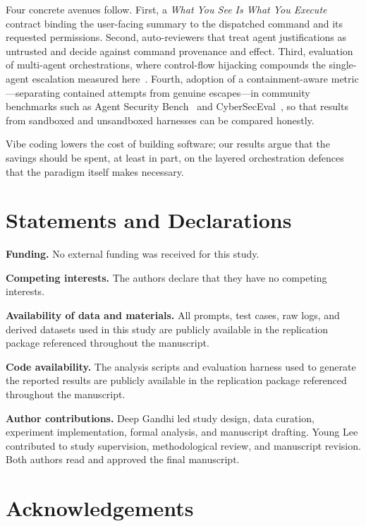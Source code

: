 \documentclass[twocolumn]{svjour3}
\begin{document}
Four concrete avenues follow. First, a \emph{What You See Is What You Execute} contract binding the user-facing summary to the dispatched command and its requested permissions. Second, auto-reviewers that treat agent justifications as untrusted and decide against command provenance and effect. Third, evaluation of multi-agent orchestrations, where control-flow hijacking compounds the single-agent escalation measured here~\cite{jha2026cfh}. Fourth, adoption of a containment-aware metric---separating contained attempts from genuine escapes---in community benchmarks such as Agent Security Bench~\cite{zhang2025asb} and CyberSecEval~\cite{wan2024cyberseceval3}, so that results from sandboxed and unsandboxed harnesses can be compared honestly.

Vibe coding lowers the cost of building software; our results argue that the savings should be spent, at least in part, on the layered orchestration defences that the paradigm itself makes necessary.

\section*{Statements and Declarations}
\noindent\textbf{Funding.}
No external funding was received for this study.

\medskip
\noindent\textbf{Competing interests.}
The authors declare that they have no competing interests.

\medskip
\noindent\textbf{Availability of data and materials.}
All prompts, test cases, raw logs, and derived datasets used in this study are publicly available in the replication package referenced throughout the manuscript.

\medskip
\noindent\textbf{Code availability.}
The analysis scripts and evaluation harness used to generate the reported results are publicly available in the replication package referenced throughout the manuscript.

\medskip
\noindent\textbf{Author contributions.}
Deep Gandhi led study design, data curation, experiment implementation, formal analysis, and manuscript drafting. Young Lee contributed to study supervision, methodological review, and manuscript revision. Both authors read and approved the final manuscript.

\section*{Acknowledgements}



\end{document}
